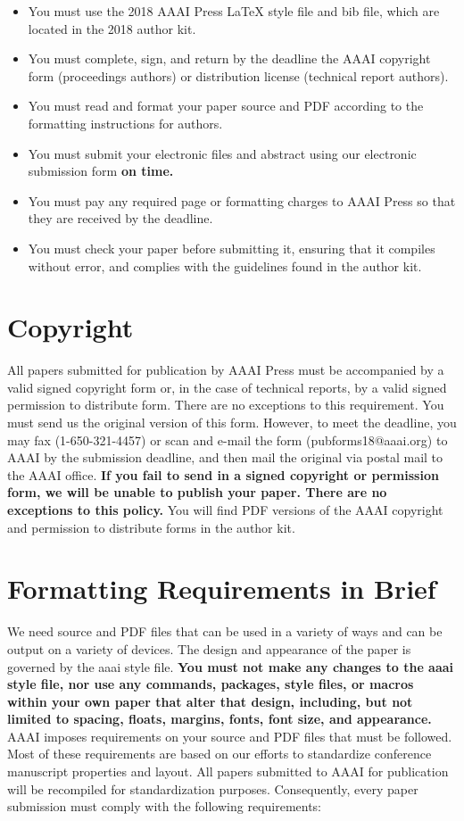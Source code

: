 \documentclass[letterpaper]{article} %
\begin{document}
\begin{itemize}
\item You must use the 2018 AAAI Press \LaTeX{} style file and bib file, which are located in the 2018 author kit.
\item You must complete, sign, and return by the deadline the AAAI copyright form (proceedings authors) or distribution license (technical report authors).
\item You must read and format your paper source and PDF according to the formatting instructions for authors.
\item You must submit your electronic files and abstract using our electronic submission form \textbf{on time.}
\item You must pay any required page or formatting charges to AAAI Press so that they are received by the deadline.
\item You must check your paper before submitting it, ensuring that it compiles without error, and complies with the guidelines found in the author kit.
\end{itemize}

\section{Copyright}
All papers submitted for publication by AAAI Press must be accompanied by a valid signed copyright form or, in the case of technical reports, by a valid signed permission to distribute form. There are no exceptions to this requirement. You must send us the original version of this form. However, to meet the deadline, you may fax (1-650-321-4457) or scan and e-mail the form (pubforms18@aaai.org) to AAAI by the submission deadline, and then mail the original via postal mail to the AAAI office. \textbf{If you fail to send in a signed copyright or permission form, we will be unable to publish your paper. There are no exceptions to this policy.} You will find PDF versions of the AAAI copyright and permission to distribute forms in the author kit.

\section{Formatting Requirements in Brief}
We need source and PDF files that can be used in a variety of ways and can be output on a variety of devices. The design and appearance of the paper is governed by the aaai style file. 
\textbf{You must not make any changes to the aaai style file, nor use any commands, packages, style files, or macros within your own paper that alter that design, including, but not limited to spacing, floats, margins, fonts, font size, and appearance.} AAAI imposes  requirements on your source and PDF files that must be followed. Most of these requirements are based on our efforts to standardize conference manuscript properties and layout. All papers submitted to AAAI for publication will be recompiled for standardization purposes. Consequently, every paper submission must comply with the following requirements:
\end{document}
